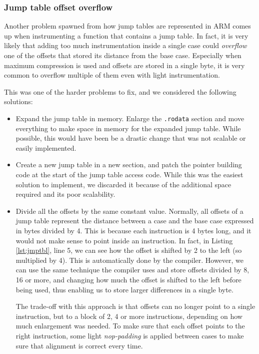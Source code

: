 \documentclass[a4paper,11pt,oneside]{report}
\begin{document}
\subsubsection{Jump table offset overflow}
Another problem spawned from how jump tables are represented in ARM comes up 
when instrumenting a function that contains a jump table. In fact, it is very 
likely that adding too much instrumentation inside a single case could 
\emph{overflow} one of the offsets that stored its distance from the base case.
Especially when maximum compression is used and offsets are stored in a single 
byte, it is very common to overflow multiple of them even with light 
instrumentation. 

This was one of the harder problems to fix, and we considered the following 
solutions:
\begin{itemize}
	\item Expand the jump table in memory. Enlarge the \texttt{.rodata} section 
		and move everything to make space in memory for the expanded jump 
		table. While possible, this would have been be a drastic change that 
		was not scalable or easily implemented.
	\item Create a new jump table in a new section, and patch the pointer 
		building code at the start of the jump table access code. While this 
		was the easiest solution to implement, we discarded it because of the 
		additional space required and its poor scalability.
	\item Divide all the offsets by the same constant value. Normally, all 
		offsets of a jump table represent the distance between a case and the 
		base case expressed in bytes divided by 4. This is because each 
		instruction is 4 bytes long, and it would not make sense to point 
		inside an instruction. In fact, in Listing \ref{lst:jmptbl}, line 5, we 
		can see how the offset is shifted by 2 to the left (so multiplied by 
		4). This is automatically done by the compiler. However, we can use the 
		same technique the compiler uses and store offsets divided by 8, 16 or 
		more, and changing how much the offset is shifted to the left before 
		being used, thus enabling us to store larger differences in a single 
		byte. 

		The trade-off with this approach is that offsets can no longer point to 
		a single instruction, but to a block of 2, 4 or more instructions, 
		depending on how much enlargement was needed. To make sure that each 
		offset points to the right instruction, some light \emph{nop-padding} 
		is applied between cases to make sure that alignment is correct every 
		time.
\end{itemize}
\end{document}

